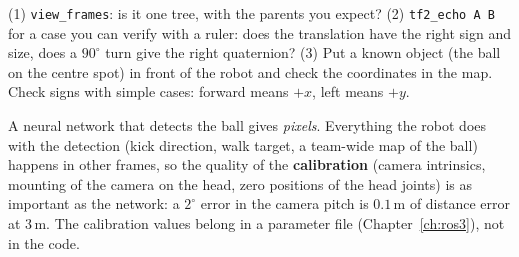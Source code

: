 \begin{keyidea}
(1) \verb!view_frames!: is it one tree, with the parents you expect? (2) \verb!tf2_echo A B! for a case you can verify with a ruler: does the translation have the right sign and size, does a $90^\circ$ turn give the right quaternion? (3) Put a known object (the ball on the centre spot) in front of the robot and check the coordinates in the map. Check signs with simple cases: forward means $+x$, left means $+y$.
\end{keyidea}

\begin{aibox}
A neural network that detects the ball gives \emph{pixels}. Everything the robot does with the detection (kick direction, walk target, a team-wide map of the ball) happens in other frames, so the quality of the \textbf{calibration} (camera intrinsics, mounting of the camera on the head, zero positions of the head joints) is as important as the network: a $2^\circ$ error in the camera pitch is $0.1$\,m of distance error at $3$\,m. The calibration values belong in a parameter file (Chapter~\ref{ch:ros3}), not in the code.
\end{aibox}

